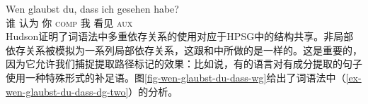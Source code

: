 \ea
\label{ex-wen-glaubst-du-dass-dg-two}
\gll Wen glaubst du, dass ich gesehen habe?\\
     谁 认为 你 \textsc{comp} 我 看见 \textsc{aux}\\
\z
Hudson证明了词语法\indexwg 中多重依存关系的使用对应于HPSG\indexhpsg 中的结构共享\citep[]{Hudson97a}。非局部依存关系被模拟为一系列局部依存关系，这跟\gpsgc 和\hpsgc 中所做的是一样的。这是重要的，因为它允许我们捕捉提取路径标记的效果\citep*[--2, \S~3.2]{BMS2001a}：比如说，有的语言对有成分提取的句子使用一种特殊形式的补足语。图\vref{fig-wen-glaubst-du-dass-wg}给出了词语法中（\ref{ex-wen-glaubst-du-dass-dg-two}）的分析。
